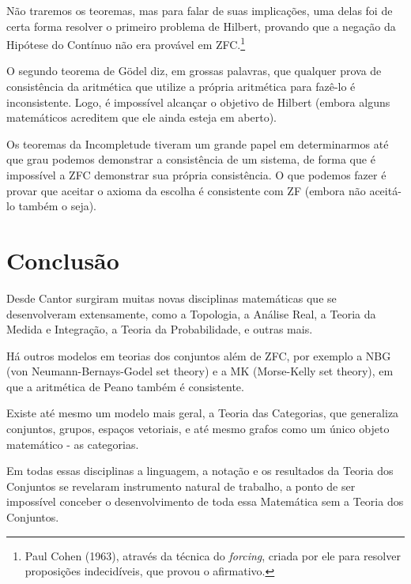\documentclass[a4paper,10pt]{article}
\begin{document}
Não traremos os teoremas, mas para falar de suas implicações, uma delas foi de certa forma resolver o primeiro problema de Hilbert, provando que a negação da Hipótese do Contínuo não era provável em ZFC.\footnote{Paul Cohen (1963), através da técnica do \emph{forcing}, criada por ele para resolver proposições indecidíveis, que provou o afirmativo.}

O segundo teorema de Gödel diz, em grossas palavras, que qualquer prova de consistência da aritmética que utilize a própria aritmética para fazê-lo é inconsistente. Logo, é impossível alcançar o objetivo de Hilbert (embora alguns matemáticos acreditem que ele ainda esteja em aberto).

Os teoremas da Incompletude tiveram um grande papel em determinarmos até que grau podemos demonstrar a consistência de um sistema, de forma que é impossível a ZFC demonstrar sua própria consistência. O que podemos fazer é provar que aceitar o axioma da escolha é consistente com ZF (embora não aceitá-lo também o seja).

\section{Conclusão}

Desde Cantor surgiram muitas novas disciplinas matemáticas que se desenvolveram extensamente, como a Topologia, a Análise Real, a Teoria da Medida e Integração, a Teoria da Probabilidade, e outras mais. \cite{rpm04}

Há outros modelos em teorias dos conjuntos além de ZFC, por exemplo a NBG (von Neumann-Bernays-Godel set theory) e a MK (Morse-Kelly set theory), em que a aritmética de Peano também é consistente.

Existe até mesmo um modelo mais geral, a Teoria das Categorias, que generaliza conjuntos, grupos, espaços vetoriais, e até mesmo grafos como um único objeto matemático - as categorias. 

Em todas essas disciplinas a linguagem, a notação e os resultados da Teoria dos Conjuntos se revelaram instrumento natural de trabalho, a ponto de ser impossível conceber o desenvolvimento de toda essa Matemática sem a Teoria dos Conjuntos.
\end{document}
